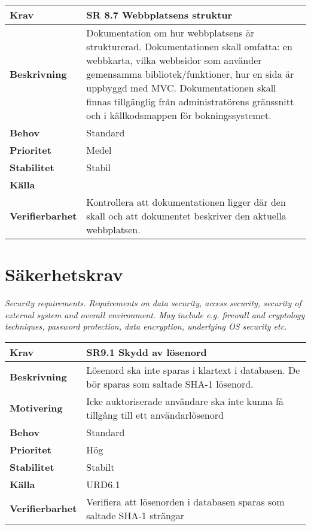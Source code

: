 \documentclass[a4paper, twoside, 11pt, titlepage]{article}
\begin{document}
	\begin{tabular} { p{2.6cm} p{12.5cm} }
		\hline
		\sffamily\textbf{Krav} & \sffamily\textbf{SR 8.7 Webbplatsens struktur } \\
		\hline
		\sffamily\textbf{Beskrivning} & Dokumentation om hur webbplatsens är strukturerad. Dokumentationen skall omfatta: en webbkarta, vilka webbsidor som använder gemensamma bibliotek/funktioner, hur en sida är uppbyggd med MVC. Dokumentationen skall finnas tillgänglig från administratörens gränssnitt och i  källkodsmappen för bokningssystemet.  \\
		\hline
		\sffamily\textbf{Behov} & Standard  \\
		\hline
		\sffamily\textbf{Prioritet} & Medel  \\
		\hline
		\sffamily\textbf{Stabilitet} & Stabil  \\
		\hline
		\sffamily\textbf{Källa} &   \\
		\hline
		\sffamily\textbf{Verifierbarhet} & Kontrollera att dokumentationen ligger där den skall och att dokumentet beskriver den aktuella webbplatsen.  \\
		\hline
	\end{tabular}


\clearpage
\section{Säkerhetskrav}


\emph{Security requirements. Requirements on data security, access security, security of external system and overall environment. May include e.g. firewall and cryptology techniques, password protection, data encryption, underlying OS security etc.}

\begin{tabular} { p{2.6cm} p{12.5cm} }
	\hline
	\sffamily\textbf{Krav} & SR9.1 Skydd av lösenord  \\
	\hline
	\sffamily\textbf{Beskrivning} & Lösenord ska inte sparas i klartext i databasen. De bör sparas som saltade SHA-1 lösenord.  \\
	\hline
	\sffamily\textbf{Motivering} & Icke auktoriserade användare ska inte kunna få tillgång till ett användarlösenord  \\
	\hline
	\sffamily\textbf{Behov} & Standard  \\
	\hline
	\sffamily\textbf{Prioritet} & Hög  \\
	\hline
	\sffamily\textbf{Stabilitet} & Stabilt  \\
	\hline
	\sffamily\textbf{Källa} & URD6.1  \\
	\hline
	\sffamily\textbf{Verifierbarhet} & Verifiera att lösenorden i databasen sparas som saltade SHA-1 strängar  \\
	\hline
\end{tabular}
\vspace{6mm}
\end{document}
